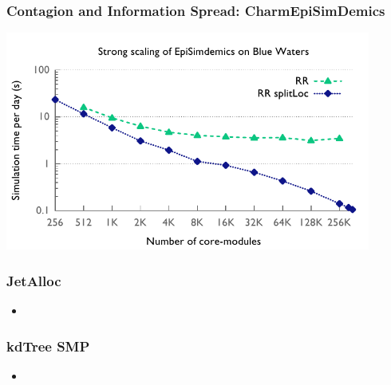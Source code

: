 \begin{frame}
\frametitle{Contagion and Information Spread: CharmEpiSimDemics}
\includegraphics[width=0.9\textwidth]{../figures/simdemics_strong_scaling.pdf}
\end{frame}


\begin{frame}
\frametitle{JetAlloc}
%
\begin{itemize}
\item
\end{itemize}
%
\end{frame}

\begin{frame}
\frametitle{kdTree SMP}
\begin{itemize}
\item
\end{itemize}
%
\end{frame}

